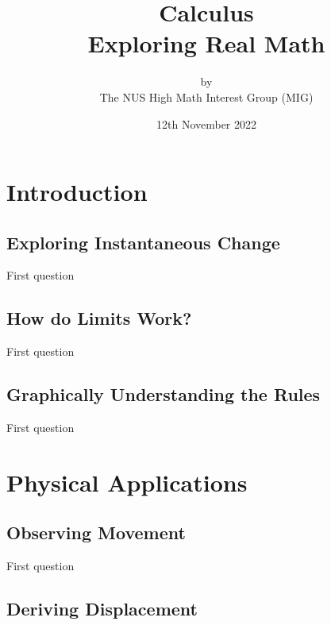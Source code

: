 \documentclass[a4paper,12pt,oneside]{exam}
\title{%
  \Huge Calculus \\
  \LARGE  Exploring \textbf{Real} Math
  }
\author{by \\
\Large The NUS High Math Interest Group (MIG) \\
}
\date{\Large 12th November 2022}
\begin{document}
\maketitle

\tableofcontents

\newpage

\section{Introduction}

\subsection{Exploring Instantaneous Change}

\begin{questions}
\question First question
\end{questions}

\subsection{How do Limits Work?}

\begin{questions}
\question First question
\end{questions}

\subsection{Graphically Understanding the Rules}

\begin{questions}
\question First question
\end{questions}

\newpage
\section{Physical Applications}

\subsection{Observing Movement}

\begin{questions}
\question First question
\end{questions}

\subsection{Deriving Displacement}
\end{document}
